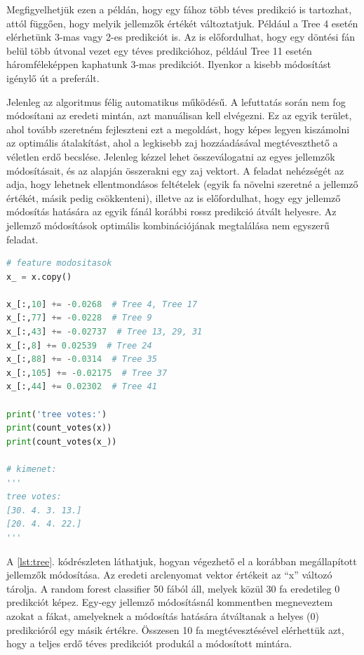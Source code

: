 Megfigyelhetjük ezen a példán, hogy egy fához több téves predikció is tartozhat, attól függően, hogy melyik jellemzők értékét változtatjuk. Például a Tree 4 esetén elérhetünk 3-mas vagy 2-es predikciót is. Az is előfordulhat, hogy egy döntési fán belül több útvonal vezet egy téves predikcióhoz, például Tree 11 esetén háromféleképpen kaphatunk 3-mas predikciót. Ilyenkor a kisebb módosítást igénylő út a preferált. 

Jelenleg az algoritmus félig automatikus működésű. A lefuttatás során nem fog módosítani az eredeti mintán, azt manuálisan kell elvégezni. Ez az egyik terület, ahol tovább szeretném fejleszteni ezt a megoldást, hogy képes legyen kiszámolni az optimális átalakítást, ahol a legkisebb zaj hozzáadásával megtéveszthető a véletlen erdő becslése. Jelenleg kézzel lehet összeválogatni az egyes jellemzők módosításait, és az alapján összerakni egy zaj vektort. A feladat nehézségét az adja, hogy lehetnek ellentmondásos feltételek (egyik fa növelni szeretné a jellemző értékét, másik pedig csökkenteni), illetve az is előfordulhat, hogy egy jellemző módosítás hatására az egyik fánál korábbi rossz predikció átvált helyesre. Az jellemző módosítások optimális kombinációjának megtalálása nem egyszerű feladat.

\begin{lstlisting}[language=python, caption={Korábbi elemzés alapján manuálisan elvégzett jellemző módosítások.}, label=lst:tree]
# feature modositasok
x_ = x.copy()

x_[:,10] += -0.0268  # Tree 4, Tree 17
x_[:,77] += -0.0228  # Tree 9
x_[:,43] += -0.02737  # Tree 13, 29, 31
x_[:,8] += 0.02539  # Tree 24
x_[:,88] += -0.0314  # Tree 35
x_[:,105] += -0.02175  # Tree 37
x_[:,44] += 0.02302  # Tree 41

print('tree votes:')
print(count_votes(x))
print(count_votes(x_))

# kimenet:
'''
tree votes:
[30. 4. 3. 13.]
[20. 4. 4. 22.]
'''
\end{lstlisting}

A \ref{lst:tree}. kódrészleten láthatjuk, hogyan végezhető el a korábban megállapított jellemzők módosítása. Az eredeti arclenyomat vektor értékeit az ``x'' változó tárolja. A random forest classifier 50 fából áll, melyek közül 30 fa eredetileg 0 predikciót képez. Egy-egy jellemző módosításnál kommentben megneveztem azokat a fákat, amelyeknek a módosítás hatására átváltanak a helyes (0) predikcióról egy másik értékre. Összesen 10 fa megtévesztésével elérhettük azt, hogy a teljes erdő téves predikciót produkál a módosított mintára. 

